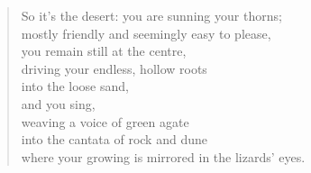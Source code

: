 {\begin{verse}
So it's the desert: you are sunning your thorns;\\
mostly friendly and seemingly easy to please,\\
you remain still at the centre,\\
driving your endless, hollow roots\\
into the loose sand,\\
and you sing,\\
weaving a voice of green agate\\
into the cantata of rock and dune\\
where your growing is mirrored in the lizards' eyes.

\end{verse}

}
